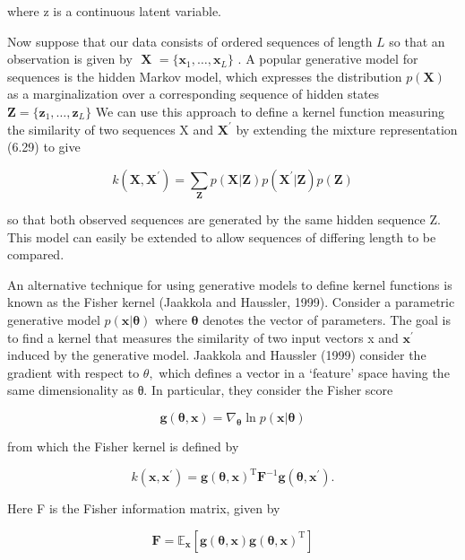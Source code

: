 \documentclass[
  10
]{article}
\begin{document}
where z is a continuous latent variable.

Now suppose that our data consists of ordered sequences of length \(L\)
so that an observation is given by
\(\textbf { X } = \{ \mathbf { x } _ { 1 } , \ldots , \mathbf { x } _ { L } \}\)
. A popular generative model for sequences is the hidden Markov model,
which expresses the distribution \(p ( \mathbf { X } )\) as a
marginalization over a corresponding sequence of hidden states
\(\mathbf { Z } = \{ \mathbf { z } _ { 1 } , \ldots , \mathbf { z } _ { L } \}\)
We can use this approach to define a kernel function measuring the
similarity of two sequences X and \(\mathbf { X } ^ { \prime }\) by
extending the mixture representation (6.29) to give

\[
k (\mathbf {X}, \mathbf {X} ^ {\prime}) = \sum_ {\mathbf {Z}} p (\mathbf {X} | \mathbf {Z}) p (\mathbf {X} ^ {\prime} | \mathbf {Z}) p (\mathbf {Z})\tag{6.31}
\]

so that both observed sequences are generated by the same hidden
sequence Z. This model can easily be extended to allow sequences of
differing length to be compared.

An alternative technique for using generative models to define kernel
functions is known as the Fisher kernel (Jaakkola and Haussler, 1999).
Consider a parametric generative model
\(p ( \mathbf { x } | \mathbf { \boldsymbol { \theta } } )\) where
\(\pmb \theta\) denotes the vector of parameters. The goal is to find a
kernel that measures the similarity of two input vectors x and
\(\mathbf { x } ^ { \prime }\) induced by the generative model. Jaakkola
and Haussler (1999) consider the gradient with respect to \(\theta ,\)
which defines a vector in a `feature' space having the same
dimensionality as θ. In particular, they consider the Fisher score

\[
\mathbf {g} (\boldsymbol {\theta}, \mathbf {x}) = \nabla_ {\boldsymbol {\theta}} \ln p (\mathbf {x} | \boldsymbol {\theta})\tag{6.32}
\]

from which the Fisher kernel is defined by

\[
k (\mathbf {x}, \mathbf {x} ^ {\prime}) = \mathbf {g} (\boldsymbol {\theta}, \mathbf {x}) ^ {\mathrm{T}} \mathbf {F} ^ {- 1} \mathbf {g} (\boldsymbol {\theta}, \mathbf {x} ^ {\prime}).\tag{6.33}
\]

Here F is the Fisher information matrix, given by

\[
\mathbf {F} = \mathbb {E} _ {\mathbf {x}} \left[ \mathbf {g} (\boldsymbol {\theta}, \mathbf {x}) \mathbf {g} (\boldsymbol {\theta}, \mathbf {x}) ^ {\mathrm{T}} \right]\tag{6.34}
\]
\end{document}

